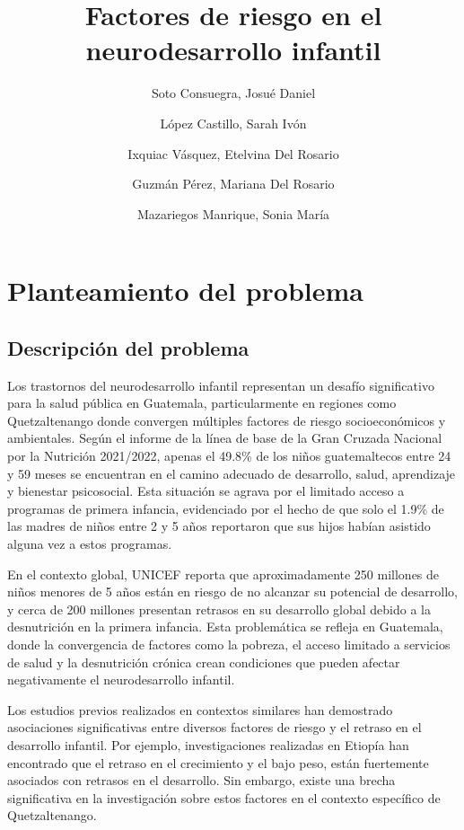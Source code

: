 \documentclass[11pt,letterpaper]{report}
\title{Factores de riesgo en el neurodesarrollo infantil}
\author{Soto Consuegra, Josué Daniel \and López Castillo, Sarah Ivón \and
Ixquiac Vásquez, Etelvina Del Rosario \and Guzmán Pérez, Mariana Del Rosario
\and Mazariegos Manrique, Sonia María}
\begin{document}
	\tableofcontents
	\chapter{Planteamiento del problema}
\section{Descripción del problema}
Los trastornos del neurodesarrollo infantil representan un desafío
significativo para la salud pública en Guatemala, particularmente en regiones
como Quetzaltenango donde convergen múltiples factores de riesgo
socioeconómicos y ambientales. Según el informe de la línea de base de la Gran
Cruzada Nacional por la Nutrición 2021/2022, apenas el 49.8\% de los niños
guatemaltecos entre 24 y 59 meses se encuentran en el camino adecuado de
desarrollo, salud, aprendizaje y bienestar psicosocial. Esta situación se
agrava por el limitado acceso a programas de primera infancia, evidenciado por
el hecho de que solo el 1.9\% de las madres de niños entre 2 y 5 años
reportaron que sus hijos habían asistido alguna vez a estos programas.
\cite{SESAN2022}

En el contexto global, UNICEF reporta que aproximadamente 250 millones de niños
menores de 5 años están en riesgo de no alcanzar su potencial de desarrollo, y
cerca de 200 millones presentan retrasos en su desarrollo global debido a la
desnutrición en la primera infancia. \cite{UNICEF2023} Esta problemática se
refleja en Guatemala, donde la convergencia de factores como la pobreza, el
acceso limitado a servicios de salud y la desnutrición crónica crean
condiciones que pueden afectar negativamente el neurodesarrollo infantil.

Los estudios previos realizados en contextos similares han demostrado
asociaciones significativas entre diversos factores de riesgo y el retraso en
el desarrollo infantil. Por ejemplo, investigaciones realizadas en Etiopía han
encontrado que el retraso en el crecimiento y el bajo peso, están fuertemente
asociados con retrasos en el desarrollo. Sin embargo, existe una brecha
significativa en la investigación sobre estos factores en el contexto
específico de Quetzaltenango.
\end{document}
